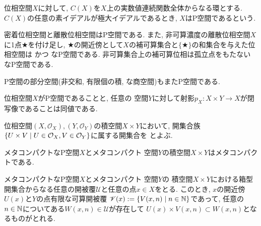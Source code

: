 \documentclass[uplatex, dvipdfmx, a4paper, 12pt, class=jsbook, crop=false]{standalone}
\begin{document}
\begin{definition}
	位相空間$ X $に対して, $ C(X) $を$ X $上の実数値連続関数全体からなる環とする. 
	$ C(X) $の任意の素イデアルが極大イデアルであるとき, $ X $はP空間であるという.
\end{definition}

密着位相空間と離散位相空間はP空間である. また, 非可算濃度の離散位相空間$ X $に1点$ \bigstar $を付け足し, 
$ \bigstar $の開近傍として$ X $の補可算集合と$ \{\bigstar\} $の和集合を与えた位相空間は \Hausdorff かつ \Lindelof なP空間である. 
非可算集合上の補可算位相は孤立点をもたない  なP空間である.

\begin{proposition}
	\label{prop: Subspace of a P-space is also a P-space}
	P空間の部分空間(非交和, 有限個の積, な商空間)もまたP空間である.
\end{proposition}

\begin{proposition}
	\label{prop: An equivalent condition that a space is a P-space}
	位相空間$ X $がP空間であることと, 
	任意の \Lindelof 空間$ Y $に対して射影$ p_X \colon X \times Y \to X $が閉写像であることは同値である.
\end{proposition}

\begin{definition}
	位相空間$ (X, \mathcal{O}_X), (Y, \mathcal{O}_Y) $の積空間$ X \times Y $において, 
	開集合族$ \setcomp{U \times V}{U \in \mathcal{O}_X, V \in \mathcal{O}_Y} $に属する開集合を
	とよぶ.
\end{definition}

\begin{proposition}
	\label{prop:A product of a MetaCpt P space and a MetaCpt Lindelof space is MetaCpt}
	メタコンパクトなP空間$ X $とメタコンパクト \Lindelof 空間$ Y $の積空間$ X \times Y $はメタコンパクトである.
\end{proposition}

\begin{lemma}
	\label{Lemma1 for the statement on the metacompactness of the product space of a MetaCpt P-space and a ParaCpt Lindelof space}	
	メタコンパクトなP空間$ X $とメタコンパクト \Lindelof 空間$ Y $の
	積空間$ X \times Y $における箱型開集合からなる任意の開被覆$ \mathscr{U} $と任意の点$ x \in X $をとる. 
	このとき, $ x $の開近傍$ U(x) $と$ Y $の点有限な可算開被覆
	$ \mathscr{V}(x) \defeq \setcomp{V(x, n)}{n \in \N} $であって, 
	任意の$ n \in \mathbb{N} $についてある$ W(x, n) \in \mathscr{U} $が存在して
	$ U(x) \times V(x, n) \subset W(x, n) $となるものがとれる.
\end{lemma}
\end{document}
